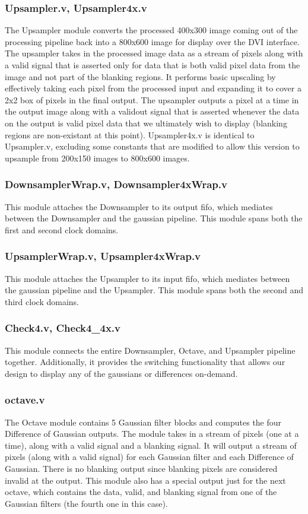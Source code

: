 \documentclass[12pt]{article}
\begin{document}
\subsubsection{Upsampler.v, Upsampler4x.v}
The Upsampler module converts the processed 400x300 image coming out of the processing
pipeline back into a 800x600 image for display over the DVI interface. The upsampler
takes in the processed image data as a stream of pixels along with a valid signal 
that is asserted only for data that is both valid pixel data from the image and
not part of the blanking regions. It performs basic upscaling by effectively taking
each pixel from the processed input and expanding it to cover a 2x2 box of 
pixels in the final output. The upsampler outputs a pixel at a time in the output 
image along with a validout signal that is asserted whenever the data on the 
output is valid pixel data that we ultimately wish to display (blanking regions
are non-existant at this point). Upsampler4x.v is identical to Upsampler.v, 
excluding some constants that are modified to allow this version to upsample 
from 200x150 images to 800x600 images.

\subsubsection{DownsamplerWrap.v, Downsampler4xWrap.v}
This module attaches the Downsampler to its output fifo, which mediates between
the Downsampler and the gaussian pipeline. This module spans both the first
and second clock domains.

\subsubsection{UpsamplerWrap.v, Upsampler4xWrap.v}
This module attaches the Upsampler to its input fifo, which mediates between
the gaussian pipeline and the Upsampler. This module spans both the second and
third clock domains.

\subsubsection{Check4.v, Check4\_4x.v}
This module connects the entire Downsampler, Octave, and Upsampler pipeline together.
Additionally, it provides the switching functionality that allows our design to 
display any of the gaussians or differences on-demand.

\subsubsection{octave.v}
The Octave module contains 5 Gaussian filter blocks and computes the four 
Difference of Gaussian outputs. The module takes in a stream of pixels (one at 
a time), along with a valid signal and a blanking signal. It will output a 
stream of pixels (along with a valid signal) for each Gaussian filter and each 
Difference of Gaussian. There is no blanking output since blanking pixels are 
considered invalid at the output. This module also has a special output just 
for the next octave, which contains the data, valid, and blanking signal from 
one of the Gaussian filters (the fourth one in this case).
\end{document}
